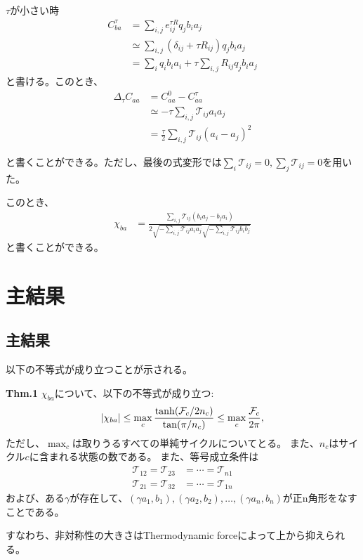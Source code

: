 \documentclass[a4paper,11pt]{jsarticle}
\numberwithin{equation}{section}
\begin{document}
$\tau$が小さい時
\begin{align}
    C_{ba}^{\tau} &= \sum_{i,j}e^{\tau R}_{ij} q_j b_i a_j \\
    &\simeq \sum_{i,j}(\delta_{ij} + \tau R_{ij}) q_j b_i a_j \\
    &= \sum_{i} q_i b_i a_i + \tau \sum_{i,j} R_{ij} q_j b_i a_j
\end{align}
と書ける。このとき、
\begin{align}
    \Delta_{\tau} C_{aa} &=C_{aa}^{0} - C_{aa}^{\tau} \\
    &\simeq -\tau \sum_{i,j} \mathcal{T}_{ij} a_i a_j\\
    &= \frac{\tau}{2}\sum_{i,j}\mathcal{T}_{ij}(a_i - a_j)^2
\end{align}

と書くことができる。ただし、最後の式変形では$\sum_{i} \mathcal{T}_{ij} =0, \sum_{j} \mathcal{T}_{ij} =0$を用いた。

このとき、
\begin{align}
    \chi_{ba} &= \frac{\sum_{i,j}\mathcal{T}_{ij}(b_ia_j-b_ja_i)}{2\sqrt{-\sum_{i,j} \mathcal{T}_{ij}a_ia_j }\sqrt{-\sum_{i,j} \mathcal{T}_{ij}b_ib_j}}
\end{align}
と書くことができる。

\section{主結果}
\subsection{主結果}
以下の不等式が成り立つことが示される。
\begin{itembox}[l]{\textbf{Thm.1}}
    $\chi_{ba}$について、以下の不等式が成り立つ:
    \begin{align}
    \abs{\chi_{ba}} \leq \max_{c} 
\frac{\tanh(\mathcal{F}_c / 2n_c)}{\tan(\pi / n_c)} 
\leq \max_{c} \frac{\mathcal{F}_c}{2\pi},
\end{align}
ただし、$\max_{c}$は取りうるすべての単純サイクルについてとる。
また、$n_c$はサイクル$c$に含まれる状態の数である。
また、等号成立条件は
\begin{align}
    \mathcal{T}_{12} = \mathcal{T}_{23} &= \cdots = \mathcal{T}_{n1}\\
    \mathcal{T}_{21} = \mathcal{T}_{32} &= \cdots = \mathcal{T}_{1n}
\end{align}
および、ある$\gamma$が存在して、$(\gamma a_1, b_1), (\gamma a_2, b_2), \ldots, (\gamma a_n, b_n)$が正n角形をなすことである。
\end{itembox}
すなわち、非対称性の大きさはThermodynamic forceによって上から抑えられる。
\end{document}
